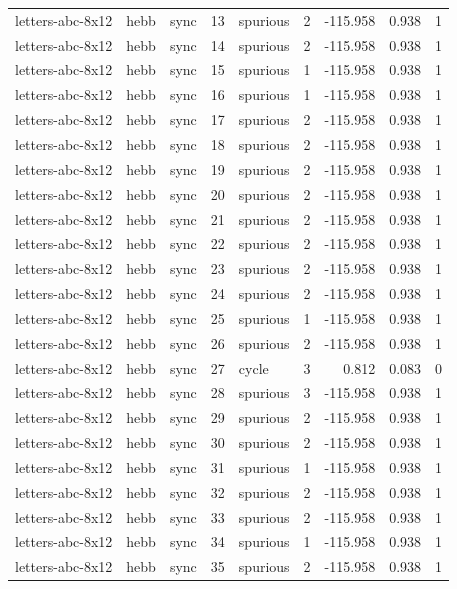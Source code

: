 \begin{tabular}{lllrlrrrr}
letters-abc-8x12 & hebb & sync & 13 & spurious & 2 & -115.958 & 0.938 & 1 \\
letters-abc-8x12 & hebb & sync & 14 & spurious & 2 & -115.958 & 0.938 & 1 \\
letters-abc-8x12 & hebb & sync & 15 & spurious & 1 & -115.958 & 0.938 & 1 \\
letters-abc-8x12 & hebb & sync & 16 & spurious & 1 & -115.958 & 0.938 & 1 \\
letters-abc-8x12 & hebb & sync & 17 & spurious & 2 & -115.958 & 0.938 & 1 \\
letters-abc-8x12 & hebb & sync & 18 & spurious & 2 & -115.958 & 0.938 & 1 \\
letters-abc-8x12 & hebb & sync & 19 & spurious & 2 & -115.958 & 0.938 & 1 \\
letters-abc-8x12 & hebb & sync & 20 & spurious & 2 & -115.958 & 0.938 & 1 \\
letters-abc-8x12 & hebb & sync & 21 & spurious & 2 & -115.958 & 0.938 & 1 \\
letters-abc-8x12 & hebb & sync & 22 & spurious & 2 & -115.958 & 0.938 & 1 \\
letters-abc-8x12 & hebb & sync & 23 & spurious & 2 & -115.958 & 0.938 & 1 \\
letters-abc-8x12 & hebb & sync & 24 & spurious & 2 & -115.958 & 0.938 & 1 \\
letters-abc-8x12 & hebb & sync & 25 & spurious & 1 & -115.958 & 0.938 & 1 \\
letters-abc-8x12 & hebb & sync & 26 & spurious & 2 & -115.958 & 0.938 & 1 \\
letters-abc-8x12 & hebb & sync & 27 & cycle & 3 & 0.812 & 0.083 & 0 \\
letters-abc-8x12 & hebb & sync & 28 & spurious & 3 & -115.958 & 0.938 & 1 \\
letters-abc-8x12 & hebb & sync & 29 & spurious & 2 & -115.958 & 0.938 & 1 \\
letters-abc-8x12 & hebb & sync & 30 & spurious & 2 & -115.958 & 0.938 & 1 \\
letters-abc-8x12 & hebb & sync & 31 & spurious & 1 & -115.958 & 0.938 & 1 \\
letters-abc-8x12 & hebb & sync & 32 & spurious & 2 & -115.958 & 0.938 & 1 \\
letters-abc-8x12 & hebb & sync & 33 & spurious & 2 & -115.958 & 0.938 & 1 \\
letters-abc-8x12 & hebb & sync & 34 & spurious & 1 & -115.958 & 0.938 & 1 \\
letters-abc-8x12 & hebb & sync & 35 & spurious & 2 & -115.958 & 0.938 & 1 \\

\end{tabular}
